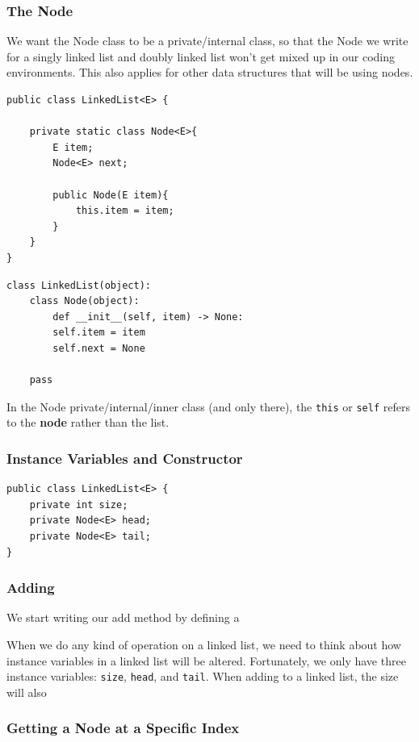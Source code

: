 \documentclass[10pt,a4paper]{book}
\begin{document}
\subsubsection{The Node}
We want the Node class to be a private/internal class, so that the Node we write for a singly linked list and doubly linked list won't get mixed up in our coding environments.
This also applies for other data structures that will be using nodes.

\begin{verbatim}
public class LinkedList<E> { 
	
	private static class Node<E>{
		E item;
		Node<E> next;
		
		public Node(E item){
			this.item = item;
		}
	}
}
\end{verbatim}

\begin{verbatim}
class LinkedList(object):
	class Node(object):
		def __init__(self, item) -> None:
		self.item = item
		self.next = None

	pass
\end{verbatim}


In the Node private/internal/inner class (and only there), the \texttt{this} or \texttt{self} refers to the \textbf{node} rather than the list.





\subsubsection{Instance Variables and Constructor}


\begin{verbatim}
public class LinkedList<E> { 
	private int size;
	private Node<E> head;
	private Node<E> tail;
}
\end{verbatim}

\subsubsection{Adding}
We start writing our add method by defining a 


When we do any kind of operation on a linked list, we need to think about how instance variables in a linked list will be altered. 
Fortunately, we only have three instance variables: \texttt{size}, \texttt{head}, and \texttt{tail}.
When adding to a linked list, the size will also


\subsubsection{Getting a Node at a Specific Index}
\end{document}
